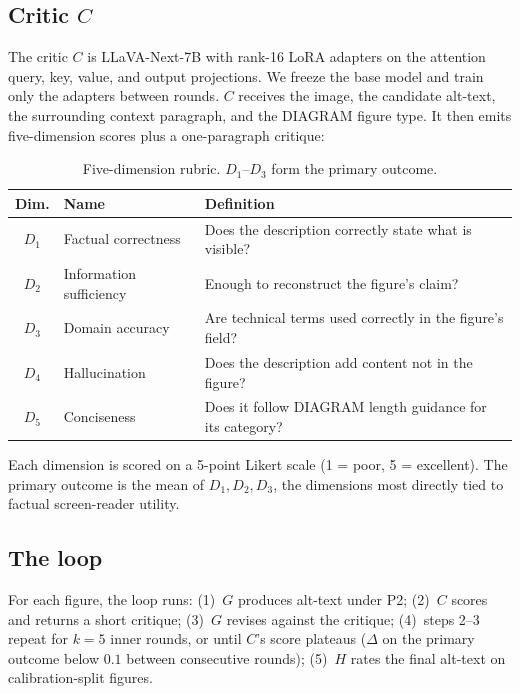 \documentclass[pdflatex,sn-mathphys-num]{sn-jnl}
\begin{document}
\subsection{\texorpdfstring{Critic $C$}{Critic C}}\label{subsec:critic}

The critic $C$ is LLaVA-Next-7B with rank-16 LoRA adapters on the attention query, key, value, and output projections. We freeze the base model and train only the adapters between rounds. $C$ receives the image, the candidate alt-text, the surrounding context paragraph, and the DIAGRAM figure type. It then emits five-dimension scores plus a one-paragraph critique:

\begin{table}[!htb]
\caption{Five-dimension rubric. $D_1$--$D_3$ form the primary outcome.}\label{tab:rubric}
\centering
\small
\begin{tabular}{cll}
\toprule
Dim. & Name & Definition \\
\midrule
$D_1$ & Factual correctness & Does the description correctly state what is visible? \\
$D_2$ & Information sufficiency & Enough to reconstruct the figure's claim? \\
$D_3$ & Domain accuracy & Are technical terms used correctly in the figure's field? \\
$D_4$ & Hallucination & Does the description add content not in the figure? \\
$D_5$ & Conciseness & Does it follow DIAGRAM length guidance for its category? \\
\bottomrule
\end{tabular}
\end{table}

Each dimension is scored on a 5-point Likert scale (1 = poor, 5 = excellent). The primary outcome is the mean of $D_1, D_2, D_3$, the dimensions most directly tied to factual screen-reader utility.

\subsection{The loop}\label{subsec:loop}

For each figure, the loop runs: (1)~$G$ produces alt-text under P2; (2)~$C$ scores and returns a short critique; (3)~$G$ revises against the critique; (4)~steps 2--3 repeat for $k = 5$ inner rounds, or until $C$'s score plateaus ($\Delta$ on the primary outcome below $0.1$ between consecutive rounds); (5)~$H$ rates the final alt-text on calibration-split figures.
\end{document}
